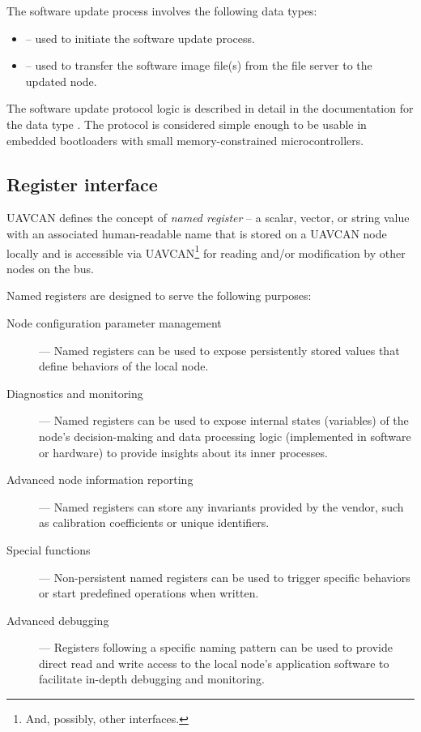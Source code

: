 The software update process involves the following data types:

\begin{itemize}
    \item {} -- used to initiate the software update process.
    \item {} -- used to transfer the software image file(s)
          from the file server to the updated node.
\end{itemize}

The software update protocol logic is described in detail in the documentation for the data type
.
The protocol is considered simple enough to be usable in embedded bootloaders with
small memory-constrained microcontrollers.

\subsection{Register interface}\label{sec:application_functions_register}

UAVCAN defines the concept of \emph{named register} -- a scalar, vector, or string value with an associated
human-readable name that is stored on a UAVCAN node locally and is accessible via
UAVCAN\footnote{And, possibly, other interfaces.} for reading and/or modification
by other nodes on the bus.

Named registers are designed to serve the following purposes:
\begin{description}
    \item[Node configuration parameter management] --- Named registers can be used to expose persistently stored
          values that define behaviors of the local node.

    \item[Diagnostics and monitoring] --- Named registers can be used to expose internal states (variables) of
          the node's decision-making and data processing logic (implemented in software or hardware) to provide
          insights about its inner processes.

    \item[Advanced node information reporting] --- Named registers can store any invariants provided by the vendor,
          such as calibration coefficients or unique identifiers.

    \item[Special functions] --- Non-persistent named registers can be used to trigger specific behaviors or
          start predefined operations when written.

    \item[Advanced debugging] --- Registers following a specific naming pattern can be used to provide direct read
          and write access to the local node's application software to facilitate in-depth debugging and monitoring.
\end{description}

